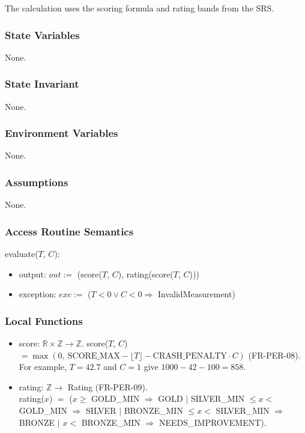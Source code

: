 \documentclass[12pt, titlepage]{article}
\begin{document}
The calculation uses the scoring formula and rating bands from the SRS.

\subsubsection{State Variables}

None.

\subsubsection{State Invariant}

None.

\subsubsection{Environment Variables}

None.

\subsubsection{Assumptions}

None.

\subsubsection{Access Routine Semantics}

\noindent evaluate($T$, $C$):
\begin{itemize}
\item output: $out :=$ (score($T$, $C$), rating(score($T$, $C$)))
\item exception: $exc :=$ ($T < 0 \vee C < 0 \Rightarrow$
  InvalidMeasurement)
\end{itemize}

\subsubsection{Local Functions}

\begin{itemize}
\item score: $\mathbb{R} \times \mathbb{Z} \rightarrow \mathbb{Z}$.
  score($T$, $C$) $= \max(0,\ \text{SCORE\_MAX} - \lfloor T \rfloor -
  \text{CRASH\_PENALTY} \cdot C)$ (FR-PER-08). For example, $T = 42.7$ and $C =
  1$ give $1000 - 42 - 100 = 858$.
\item rating: $\mathbb{Z} \rightarrow$ Rating (FR-PER-09). \\
  rating($x$) $=$ ($x \geq$ GOLD\_MIN $\Rightarrow$ GOLD $|$ SILVER\_MIN
  $\leq x <$ GOLD\_MIN $\Rightarrow$ SILVER $|$ BRONZE\_MIN $\leq x <$
  SILVER\_MIN $\Rightarrow$ BRONZE $|$ $x <$ BRONZE\_MIN $\Rightarrow$
  NEEDS\_IMPROVEMENT).
\end{itemize}
\end{document}
